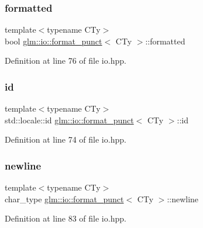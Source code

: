 \subsubsection{\texorpdfstring{formatted}{formatted}}
{\footnotesize\ttfamily template$<$typename C\+Ty$>$ \\
bool \hyperlink{classglm_1_1io_1_1format__punct}{glm\+::io\+::format\+\_\+punct}$<$ C\+Ty $>$\+::formatted}



Definition at line 76 of file io.\+hpp.

\mbox{\label{classglm_1_1io_1_1format__punct_a763f60aeaecec9290917ed1d83b79838}} 
\subsubsection{\texorpdfstring{id}{id}}
{\footnotesize\ttfamily template$<$typename C\+Ty$>$ \\
std\+::locale\+::id \hyperlink{classglm_1_1io_1_1format__punct}{glm\+::io\+::format\+\_\+punct}$<$ C\+Ty $>$\+::id\hspace{0.3cm}{\ttfamily [static]}}



Definition at line 74 of file io.\+hpp.

\mbox{\label{classglm_1_1io_1_1format__punct_a8ddf8abdb0ebbdbb7eca08d7a777956e}} 
\subsubsection{\texorpdfstring{newline}{newline}}
{\footnotesize\ttfamily template$<$typename C\+Ty$>$ \\
char\+\_\+type \hyperlink{classglm_1_1io_1_1format__punct}{glm\+::io\+::format\+\_\+punct}$<$ C\+Ty $>$\+::newline}



Definition at line 83 of file io.\+hpp.

\mbox{\label{classglm_1_1io_1_1format__punct_a9de1f3b7120a036ec0ab394d2036d0aa}} 
